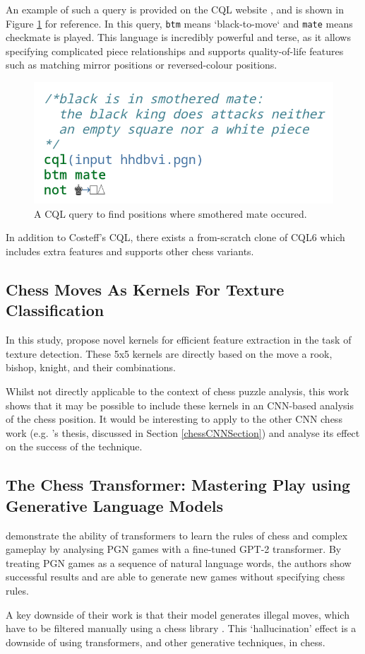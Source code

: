 An example of such a query is provided on the CQL website \citep{cqlSmothered},
and is shown in Figure \ref{cql} for reference. In this query, \texttt{btm}
means `black-to-move` and \texttt{mate} means checkmate is played. This
language is incredibly powerful and terse, as it allows specifying complicated
piece relationships and supports quality-of-life features such as matching
mirror positions or reversed-colour positions.

\begin{figure}[H]
    \centering
    \includegraphics[width=0.45\linewidth]{background/img/cql.png}
    \caption{A CQL query to find positions where smothered mate occured.}
    \label{cql}
\end{figure}

In addition to Costeff's CQL, there exists a from-scratch clone of CQL6
\citep{cqli} which includes extra features and supports other chess variants.

\subsection{Chess Moves As Kernels For Texture Classification}

In this study, \citet{chessKernel} propose novel kernels for efficient feature
extraction in the task of texture detection. These 5x5 kernels are directly
based on the move a rook, bishop, knight, and their combinations. 

Whilst not directly applicable to the context of chess puzzle analysis, this
work shows that it may be possible to include these kernels in an CNN-based
analysis of the chess position. It would be interesting to apply to the other
CNN chess work (e.g. \citeauthor{chessCNN}'s thesis, discussed in Section
\ref{chessCNNSection}) and analyse its effect on the success of the technique.

\subsection{The Chess Transformer: Mastering Play using Generative Language
Models}

\citet{chessTransformer} demonstrate the ability of transformers to learn the
rules of chess and complex gameplay by analysing PGN games with a fine-tuned
GPT-2 transformer. By treating PGN games as a sequence of natural language
words, the authors show successful results and are able to generate new games
without specifying chess rules.

A key downside of their work is that their model generates illegal moves, which
have to be filtered manually using a chess library \citep{chessTransformer}.
This `hallucination' effect is a downside of using transformers, and other
generative techniques, in chess. 

